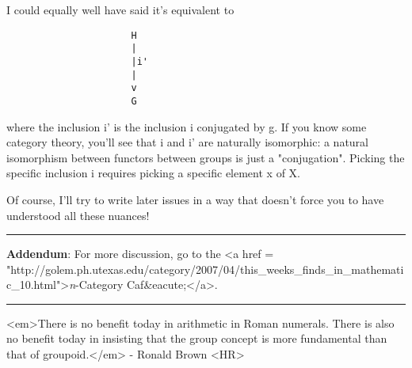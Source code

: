 I could equally well have said it's equivalent to 

\begin{verbatim}
                      H
                      |
                      |i'
                      |
                      v
                      G
\end{verbatim}
    
where the inclusion i' is the inclusion i conjugated by g.  If you
know some category theory, you'll see that i and i' are naturally
isomorphic: a natural isomorphism between functors between groups 
is just a "conjugation".  Picking the specific inclusion i requires
picking a specific element x of X.

Of course, I'll try to write later issues in a way that doesn't force
you to have understood all these nuances!

\par\noindent\rule{\textwidth}{0.4pt}
\textbf{Addendum}: For more discussion, go to the <a href =
"http://golem.ph.utexas.edu/category/2007/04/this_weeks_finds_in_mathematic_10.html">\emph{n}-Category
Caf&eacute;</a>.

\par\noindent\rule{\textwidth}{0.4pt}
<em>There is no benefit today in arithmetic in Roman numerals.
There is also no benefit today in insisting that the group concept
is more fundamental than that of groupoid.</em> - Ronald Brown
<HR>



